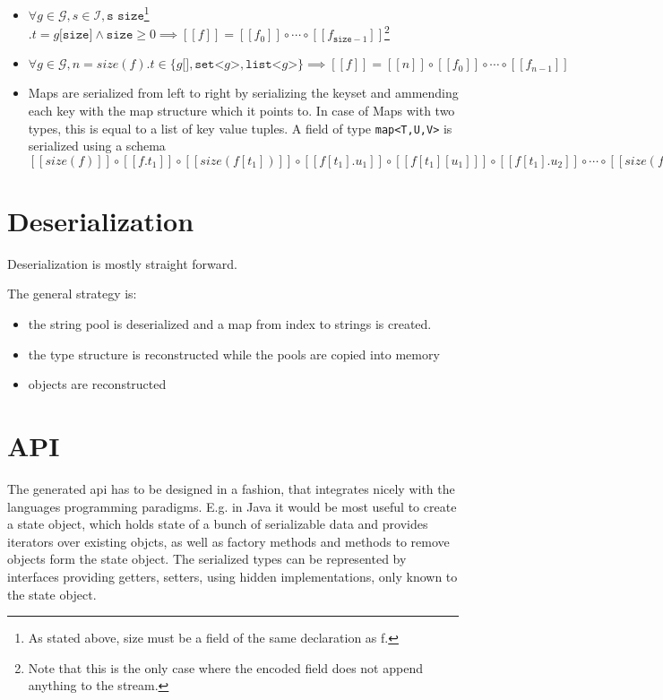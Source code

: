 \documentclass[a4paper,10pt]{article}
\newcommand{\den}[1]{[\![#1]\!]}
\begin{document}
\begin{itemize}
 \item $\forall g \in \mathcal{G}, s \in \mathcal{I}, \texttt{s size}$\footnote{As stated above, size must be a field of the same declaration as f.} $. t = g\texttt{[size]} \wedge \texttt{size} \geq 0 \implies \den{f} = \den{f_0} \circ \cdots \circ \den{f_{\texttt{size}-1}}$\footnote{Note that this is the only case where the encoded field does not append anything to the stream.}
 
 \item $\forall g \in \mathcal{G}, n = size(f). t \in \{g\texttt{[]}, \texttt{set<}g\texttt{>}, \texttt{list<}g\texttt{>}\} \implies \den{f} = \den{n} \circ \den{f_0} \circ \cdots \circ \den{f_{n-1}}$
 
 \item Maps are serialized from left to right by serializing the keyset and ammending each key with the map structure which it points to. In case of Maps with two types, this is equal to a list of key value tuples.
 A field of type \verb/map<T,U,V>/ is serialized using a schema $ \den{size(f)} \circ \den{f.t_1} \circ \den{size(f[t_1])} \circ \den{f[t_1].u_1} \circ \den{f[t_1][u_1]} \circ \den{f[t_1].u_2} \circ \cdots \circ \den{size(f[t_2])} \circ \cdots \circ \den{f[t_n][u_m]}$
\end{itemize}




\section{Deserialization}

Deserialization is mostly straight forward.

The general strategy is:
\begin{itemize}
 \item the string pool is deserialized and a map from index to strings is created.
 \item the type structure is reconstructed while the pools are copied into memory
 \item objects are reconstructed
\end{itemize}


\section{API}

The generated \gls{api} has to be designed in a fashion, that integrates nicely with the languages programming paradigms. E.g. in Java it would be most useful to create a state object, which holds state of a bunch of serializable data and provides iterators over existing objcts, as well as factory methods and methods to remove objects form the state object. The serialized types can be represented by interfaces providing getters, setters, using hidden implementations, only known to the state object.
\end{document}
